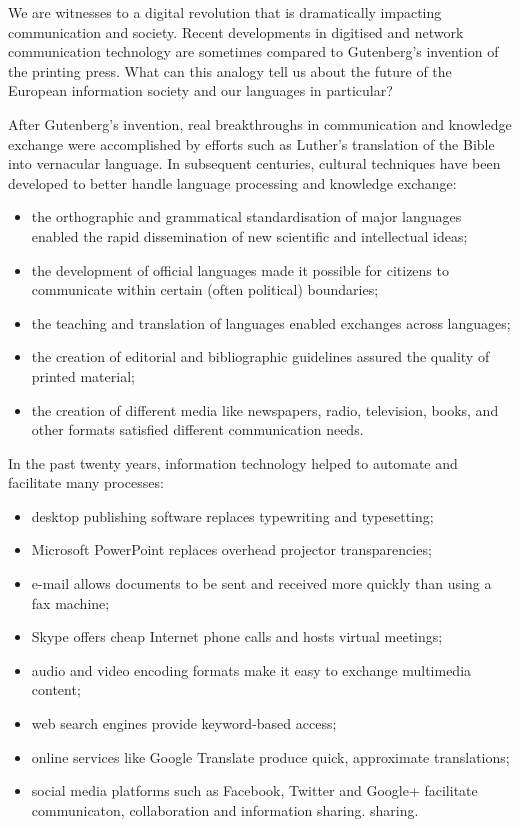 
\begin{multicols}{2}
We are witnesses to a digital revolution that is dramatically impacting communication and society. Recent developments in digitised and network communication technology are sometimes compared to Gutenberg’s invention of the printing press. What can this analogy tell us about the future of the European information society and our languages in particular?


After Gutenberg’s invention, real breakthroughs in communication and knowledge exchange were accomplished by efforts such as Luther’s translation of the Bible into vernacular language. In subsequent centuries, cultural techniques have been developed to better handle language processing and knowledge exchange:

\begin{itemize}
\item the orthographic and grammatical standardisation of major languages enabled the rapid dissemination of new scientific and intellectual ideas;
\item the development of official languages made it possible for citizens to communicate within certain (often political) boundaries;
\item the teaching and translation of languages enabled exchanges across languages;
\item the creation of editorial and bibliographic guidelines assured the quality of printed material;
\item the creation of different media like newspapers, radio, television, books, and other formats satisfied different communication needs. 
\end{itemize}

In the past twenty years, information technology helped to automate and facilitate many processes:

\begin{itemize}
\item desktop publishing software replaces typewriting and typesetting;
\item Microsoft PowerPoint replaces overhead projector transparencies;
\item e-mail allows documents to be sent and received more quickly than using a fax machine;
\item Skype offers cheap Internet phone calls and hosts virtual meetings;
\item audio and video encoding formats make it easy to exchange multimedia content;
\item web  search engines provide keyword-based access;
\item online services like Google Translate produce quick, approximate translations;
\item social media platforms such as Facebook, Twitter and Google+ facilitate communicaton, collaboration and information sharing.
 sharing.
\end{itemize}


\end{multicols}
